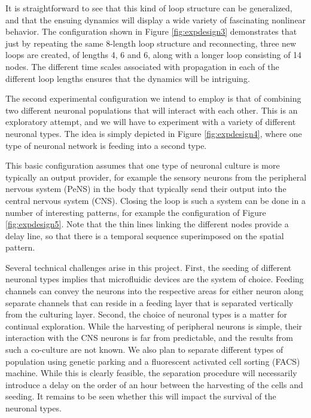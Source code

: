 It is straightforward to see that this kind of loop structure can be generalized, and that the ensuing dynamics will display a wide variety of fascinating nonlinear behavior. The configuration shown in Figure \ref{fig:expdesign3} demonstrates that just by repeating the same 8-length loop structure and reconnecting, three new loops are created, of lengths 4, 6 and 6, along with a longer loop consisting of 14 nodes. The different time scales associated with propagation in each of the different loop lengths ensures that the dynamics will be intriguing.

The second experimental configuration we intend to employ is that of combining two different neuronal populations that will interact with each other. This is an exploratory attempt, and we will have to experiment with a variety of different neuronal types. The idea is simply depicted in Figure \ref{fig:expdesign4}, where one type of neuronal network is feeding into a second type.

This basic configuration assumes that one type of neuronal culture is more typically an output provider, for example the sensory neurons from the peripheral nervous system (PeNS) in the body that typically send their output into the central nervous system (CNS). Closing the loop is such a system can be done in a number of interesting patterns, for example the configuration of Figure \ref{fig:expdesign5}. Note that the thin lines linking the different nodes provide a delay line, so that there is a temporal sequence superimposed on the spatial pattern.

Several technical challenges arise in this project. First, the seeding of different neuronal types implies that microfluidic devices are the system of choice. Feeding channels can convey the neurons into the respective areas for either neuron along separate channels that can reside in a feeding layer that is separated vertically from the culturing layer. Second, the choice of neuronal types is a matter for continual exploration. While the harvesting of peripheral neurons is simple, their interaction with the CNS neurons is far from predictable, and the results from such a co-culture are not known. We also plan to separate different types of population using genetic parking and a fluorescent activated cell sorting (FACS) machine. While this is clearly feasible, the separation procedure will necessarily introduce a delay on the order of an hour between the harvesting of the cells and seeding. It remains to be seen whether this will impact the survival of the neuronal types.


